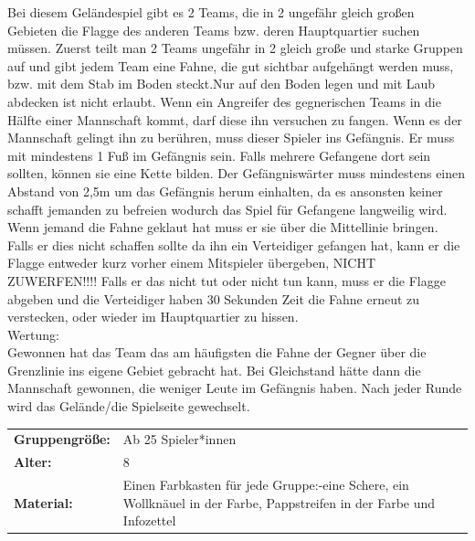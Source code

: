  Bei diesem Geländespiel gibt es 2 Teams, die in 2 ungefähr gleich großen Gebieten die Flagge des anderen Teams bzw. deren Hauptquartier suchen müssen. Zuerst teilt man 2 Teams ungefähr in 2 gleich große und starke Gruppen auf und gibt jedem Team eine Fahne, die gut sichtbar aufgehängt werden muss, bzw. mit dem Stab im Boden steckt.Nur auf den Boden legen und mit Laub abdecken ist nicht erlaubt. Wenn ein Angreifer des gegnerischen Teams in die Hälfte einer Mannschaft kommt, darf diese ihn versuchen zu fangen. Wenn es der Mannschaft gelingt ihn zu berühren, muss dieser Spieler ins Gefängnis. Er muss mit mindestens 1 Fuß im Gefängnis sein. Falls mehrere Gefangene dort sein sollten, können sie eine Kette bilden. Der Gefängniswärter muss mindestens einen Abstand von 2,5m um das Gefängnis herum einhalten, da es ansonsten keiner schafft jemanden zu befreien wodurch das Spiel für Gefangene langweilig wird. Wenn jemand die Fahne geklaut hat muss er sie über die Mittellinie bringen. Falls er dies nicht schaffen sollte da ihn ein Verteidiger gefangen hat, kann er die Flagge entweder kurz vorher einem Mitspieler übergeben, NICHT ZUWERFEN!!!! Falls er das nicht tut oder nicht tun kann, muss er die Flagge abgeben und die Verteidiger haben 30 Sekunden Zeit die Fahne erneut zu verstecken, oder wieder im Hauptquartier zu hissen. \\ \newline
    Wertung: \\ Gewonnen hat das Team das am häufigsten die Fahne der Gegner über die Grenzlinie ins eigene Gebiet gebracht hat. Bei Gleichstand hätte dann die Mannschaft gewonnen, die weniger Leute im Gefängnis haben. Nach jeder Runde wird das Gelände/die Spielseite gewechselt.
\\



\begin{table}[H]
\begin{tabular}{>{\bfseries}lp{8cm}}
   Gruppengröße:   & Ab 25 Spieler*innen\\
    Alter: & 8 \\
    Material: & Einen Farbkasten für jede Gruppe:-eine Schere, ein Wollknäuel in der Farbe, Pappstreifen in der Farbe und Infozettel \\
\end{tabular}
\end{table} 

